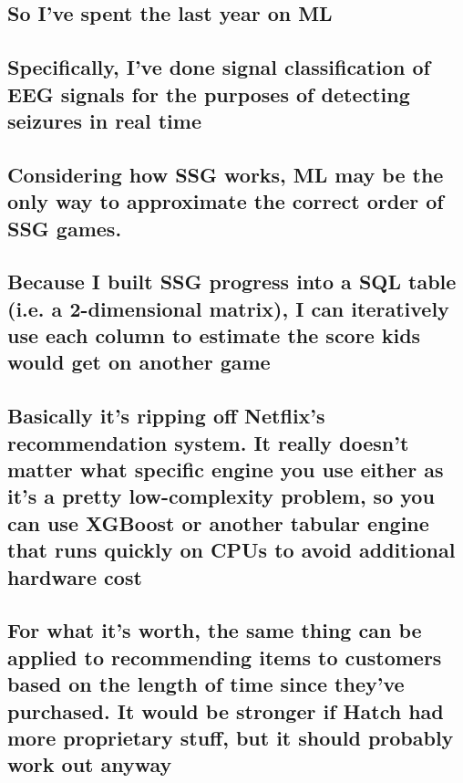 \documentclass[11pt]{article}
\begin{document}
    \subsection{So I've spent the last year on
ML}\label{so-ive-spent-the-last-year-on-ml}

\subsection{Specifically, I've done signal classification of EEG signals
for the purposes of detecting seizures in real
time}\label{specifically-ive-done-signal-classification-of-eeg-signals-for-the-purposes-of-detecting-seizures-in-real-time}

\subsection{Considering how SSG works, ML may be the only way to
approximate the correct order of SSG
games.}\label{considering-how-ssg-works-ml-may-be-the-only-way-to-approximate-the-correct-order-of-ssg-games.}

\subsection{Because I built SSG progress into a SQL table (i.e. a
2-dimensional matrix), I can iteratively use each column to estimate the
score kids would get on another
game}\label{because-i-built-ssg-progress-into-a-sql-table-i.e.-a-2-dimensional-matrix-i-can-iteratively-use-each-column-to-estimate-the-score-kids-would-get-on-another-game}

\subsection{Basically it's ripping off Netflix's recommendation system.
It really doesn't matter what specific engine you use either as it's a
pretty low-complexity problem, so you can use XGBoost or another tabular
engine that runs quickly on CPUs to avoid additional hardware
cost}\label{basically-its-ripping-off-netflixs-recommendation-system.-it-really-doesnt-matter-what-specific-engine-you-use-either-as-its-a-pretty-low-complexity-problem-so-you-can-use-xgboost-or-another-tabular-engine-that-runs-quickly-on-cpus-to-avoid-additional-hardware-cost}

    \subsection{For what it's worth, the same thing can be applied to
recommending items to customers based on the length of time since
they've purchased. It would be stronger if Hatch had more proprietary
stuff, but it should probably work out
anyway}\label{for-what-its-worth-the-same-thing-can-be-applied-to-recommending-items-to-customers-based-on-the-length-of-time-since-theyve-purchased.-it-would-be-stronger-if-hatch-had-more-proprietary-stuff-but-it-should-probably-work-out-anyway}
\end{document}

